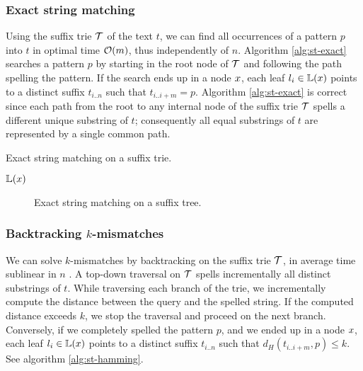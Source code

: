 \subsubsection{Exact string matching}

Using the suffix trie $\mathcal {T}$ of the text $t$, we can find all occurrences of a pattern $p$ into $t$ in optimal time $\mathcal{O}(m)$, thus independently of $n$.
Algorithm \ref{alg:st-exact} searches a pattern $p$ by starting in the root node of $\mathcal {T}$ and following the path spelling the pattern.
If the search ends up in a node $x$, each leaf $l_i \in \mathbb {L}(x)$ points to a distinct suffix $t_{i..n}$ such that $t_{i..i+m} = p$.
Algorithm \ref{alg:st-exact} is correct since each path from the root to any internal node of the suffix trie $\mathcal {T}$ spells a different unique substring of $t$; consequently all equal substrings of $t$ are represented by a single common path.

\begin{algorithm}[h]
\caption{Exact string matching on a suffix trie.}
\label{alg:st-exact}
\begin{algorithmic}[1]
		\State \Report $\mathbb {L}(x)$
		\State {}
	\EndIf
\EndProcedure
\end{algorithmic}
\end{algorithm}

\begin{figure}[h]
\caption{Exact string matching on a suffix tree.}
\label{fig:st-exact}
\end{figure}

\subsubsection{Backtracking $k$-mismatches}

We can solve $k$-mismatches by backtracking \citep{Ukkonen1993, Baeza1999} on the suffix trie $\mathcal {T}$, in average time sublinear in $n$ \citep{Navarro2000}.
A top-down traversal on $\mathcal {T}$ spells incrementally all distinct substrings of $t$.
While traversing each branch of the trie, we incrementally compute the distance between the query and the spelled string.
If the computed distance exceeds $k$, we stop the traversal and proceed on the next branch.
Conversely, if we completely spelled the pattern $p$, and we ended up in a node $x$, each leaf $l_i \in \mathbb {L}(x)$ points to a distinct suffix $t_{i..n}$ such that $d_H(t_{i..i+m}, p) \leq k$.
See algorithm \ref{alg:st-hamming}.


